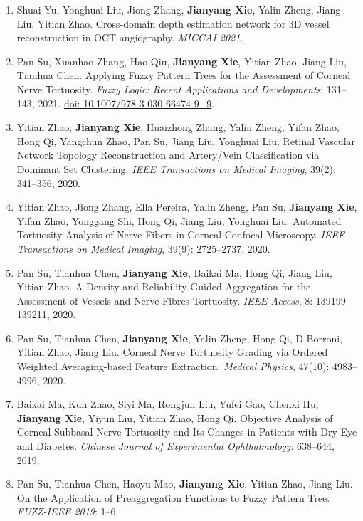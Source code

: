 \documentclass[11pt,a4paper]{article}
\begin{document}
\begin{enumerate}[label={\textcolor{accent}{\sffamily\footnotesize O\arabic*}},leftmargin=2.5em,itemsep=8pt,parsep=0pt]
\item Shuai Yu, Yonghuai Liu, Jiong Zhang, \textbf{Jianyang Xie}, Yalin Zheng, Jiang Liu, Yitian Zhao. Cross-domain depth estimation network for 3D vessel reconstruction in OCT angiography. \textit{MICCAI 2021}.
\item Pan Su, Xuanhao Zhang, Hao Qiu, \textbf{Jianyang Xie}, Yitian Zhao, Jiang Liu, Tianhua Chen. Applying Fuzzy Pattern Trees for the Assessment of Corneal Nerve Tortuosity. \textit{Fuzzy Logic: Recent Applications and Developments}: 131--143, 2021. \href{https://doi.org/10.1007/978-3-030-66474-9_9}{doi: 10.1007/978-3-030-66474-9\_9}.
\item Yitian Zhao, \textbf{Jianyang Xie}, Huaizhong Zhang, Yalin Zheng, Yifan Zhao, Hong Qi, Yangchun Zhao, Pan Su, Jiang Liu, Yonghuai Liu. Retinal Vascular Network Topology Reconstruction and Artery/Vein Classification via Dominant Set Clustering. \textit{IEEE Transactions on Medical Imaging}, 39(2): 341--356, 2020.
\item Yitian Zhao, Jiong Zhang, Ella Pereira, Yalin Zheng, Pan Su, \textbf{Jianyang Xie}, Yifan Zhao, Yonggang Shi, Hong Qi, Jiang Liu, Yonghuai Liu. Automated Tortuosity Analysis of Nerve Fibers in Corneal Confocal Microscopy. \textit{IEEE Transactions on Medical Imaging}, 39(9): 2725--2737, 2020.
\item Pan Su, Tianhua Chen, \textbf{Jianyang Xie}, Baikai Ma, Hong Qi, Jiang Liu, Yitian Zhao. A Density and Reliability Guided Aggregation for the Assessment of Vessels and Nerve Fibres Tortuosity. \textit{IEEE Access}, 8: 139199--139211, 2020.
\item Pan Su, Tianhua Chen, \textbf{Jianyang Xie}, Yalin Zheng, Hong Qi, D Borroni, Yitian Zhao, Jiang Liu. Corneal Nerve Tortuosity Grading via Ordered Weighted Averaging-based Feature Extraction. \textit{Medical Physics}, 47(10): 4983--4996, 2020.
\item Baikai Ma, Kun Zhao, Siyi Ma, Rongjun Liu, Yufei Gao, Chenxi Hu, \textbf{Jianyang Xie}, Yiyun Liu, Yitian Zhao, Hong Qi. Objective Analysis of Corneal Subbasal Nerve Tortuosity and Its Changes in Patients with Dry Eye and Diabetes. \textit{Chinese Journal of Experimental Ophthalmology}: 638--644, 2019.
\item Pan Su, Tianhua Chen, Haoyu Mao, \textbf{Jianyang Xie}, Yitian Zhao, Jiang Liu. On the Application of Preaggregation Functions to Fuzzy Pattern Tree. \textit{FUZZ-IEEE 2019}: 1--6.

\end{enumerate}
\end{document}
